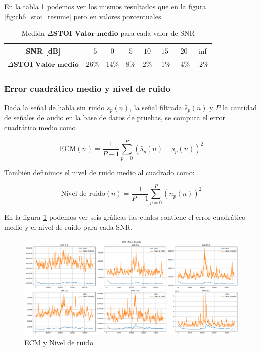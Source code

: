 En la tabla \ref{table:stoi_resume} podemos ver los mismos resultados que en la figura \ref{fig:ch6_stoi_resume} pero en valores porcentuales

\begin{table}[ht]
	\centering
	\begin{tabular}{ |c|c|c|c|c|c|c|c| } 
		\hline
		SNR [dB] & $-5$ & $0$ & $5$ & $10$ & $15$ & $20$ & $\inf$ \\ 
		\hline
		$\Delta \textbf{STOI Valor medio}$ & 26\%  & 14\%  & 8\% & 2\% & -1\% & -4\% & -2\% \\
		\hline
	\end{tabular}
	\caption{Medida $\Delta \textbf{STOI Valor medio}$ para cada valor de SNR}
	\label{table:stoi_resume}
\end{table}

\subsubsection{Error cuadrático medio y nivel de ruido}

Dada la señal de habla sin ruido $s_p(n)$, la señal filtrada $\hat{s}_p(n)$ y $P$ la cantidad de señales de audio en la base de datos de pruebas, se computa el error cuadrático medio como

\begin{equation*}
	\text{ECM}(n) = \frac{1}{P-1} \sum_{p=0}^{P} (\hat{s}_p(n) - s_p(n))^2
\end{equation*}

También definimos el nivel de ruido medio al cuadrado como:

\begin{equation*}
	\text{Nivel de ruido}(n) = \frac{1}{P-1} \sum_{p=0}^{P} (n_p(n))^2
\end{equation*}

En la figura \ref{fig:ch6_mse_and_noise_level} podemos ver seis gráficas las cuales contiene el error cuadrático medio y el nivel de ruido para cada SNR.

\begin{figure}
	\centering
	\centerline{\includegraphics[scale=0.35]{images/ch6/af/mse_and_noise_level.png}}
	\caption{ECM y Nivel de ruido}
	\label{fig:ch6_mse_and_noise_level}
\end{figure}

